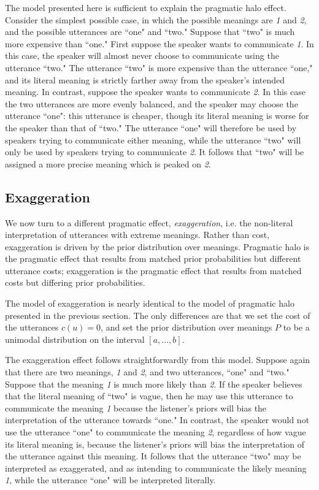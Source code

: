 \documentclass{article} %
\begin{document}
The model presented here is sufficient to explain the pragmatic halo effect. Consider the simplest possible case, in which the possible meanings are \emph{1} and \emph{2}, and the possible utterances are ``one" and ``two." Suppose that ``two" is much more expensive than ``one." First suppose the speaker wants to communicate \emph{1}. In this case, the speaker will almost never choose to communicate using the utterance ``two." The utterance ``two" is more expensive than the utterance ``one," and its literal meaning is strictly farther away from the speaker's intended meaning. In contrast, suppose the speaker wants to communicate \emph{2}. In this case the two utterances are more evenly balanced, and the speaker may choose the utterance ``one": this utterance is cheaper, though its literal meaning is worse for the speaker than that of ``two." The utterance ``one" will therefore be used by speakers trying to communicate either meaning, while the utterance ``two" will only be used by speakers trying to communicate \emph{2}. It follows that ``two" will be assigned a more precise meaning which is peaked on \emph{2}. 

\subsection{Exaggeration}

We now turn to a different pragmatic effect, \emph{exaggeration}, i.e. the non-literal interpretation of utterances with extreme meanings. Rather than cost, exaggeration is driven by the prior distribution over meanings. Pragmatic halo is the pragmatic effect that results from matched prior probabilities but different utterance costs; exaggeration is the pragmatic effect that results from matched costs but differing prior probabilities. 

The model of exaggeration is nearly identical to the model of pragmatic halo presented in the previous section. The only differences are that we set the cost of the utterances $c(u)=0$, and set the prior distribution over meanings $P$ to be a unimodal distribution on the interval $[a,...,b]$. 

The exaggeration effect follows straightforwardly from this model. Suppose again that there are two meanings, \emph{1} and \emph{2}, and two utterances, ``one" and ``two." Suppose that the meaning \emph{1} is much more likely than \emph{2}. If the speaker believes that the literal meaning of ``two" is vague, then he may use this utterance to communicate the meaning \emph{1} because the listener's priors will bias the interpretation of the utterance towards ``one." In contrast, the speaker would not use the utterance ``one" to communicate the meaning \emph{2}, regardless of how vague its literal meaning is, because the listener's priors will bias the interpretation of the utterance against this meaning. It follows that the utterance ``two" may be interpreted as exaggerated, and as intending to communicate the likely meaning \emph{1}, while the utterance ``one" will be interpreted literally.
\end{document}
